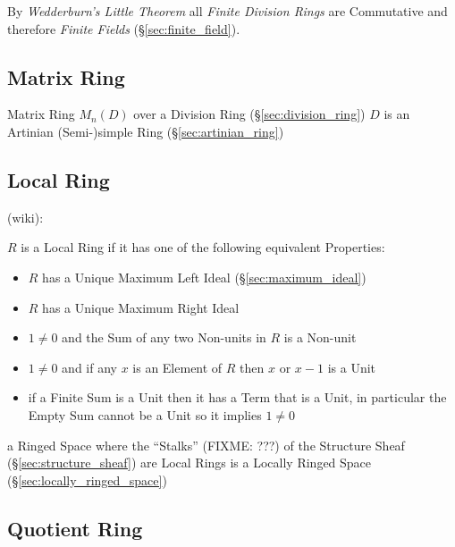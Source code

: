 \begin{itemize}
By \emph{Wedderburn's Little Theorem} all \emph{Finite Division Rings}
are Commutative and therefore \emph{Finite Fields}
(\S\ref{sec:finite_field}).



\subsection{Matrix Ring}\label{sec:matrix_ring}

Matrix Ring $M_n(D)$ over a Division Ring (\S\ref{sec:division_ring}) $D$ is an
Artinian (Semi-)simple Ring (\S\ref{sec:artinian_ring})



\subsection{Local Ring}\label{sec:local_ring}

(wiki):

$R$ is a Local Ring if it has one of the following equivalent Properties:
\begin{itemize}
  \item $R$ has a Unique Maximum Left Ideal (\S\ref{sec:maximum_ideal})
  \item $R$ has a Unique Maximum Right Ideal
  \item $1 \neq 0$ and the Sum of any two Non-units in $R$ is a Non-unit
  \item $1 \neq 0$ and if any $x$ is an Element of $R$ then $x$ or $x - 1$ is a
    Unit
  \item if a Finite Sum is a Unit then it has a Term that is a Unit, in
    particular the Empty Sum cannot be a Unit so it implies $1 \neq 0$
\end{itemize}

a Ringed Space where the ``Stalks'' (FIXME: ???) of the Structure Sheaf
(\S\ref{sec:structure_sheaf}) are Local Rings is a Locally Ringed Space
(\S\ref{sec:locally_ringed_space})



\subsection{Quotient Ring}\label{sec:quotient_ring}


\end{itemize}
